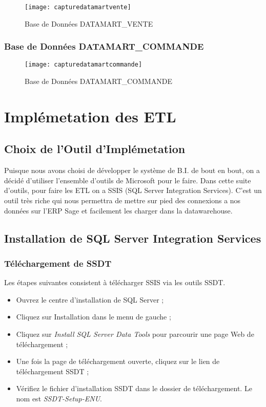 \begin{figure}[H]
    \centering
    \texttt{[image: capturedatamartvente]}
    \caption{Base de Données DATAMART\_VENTE}
    \label{fig:capturedatamartvente}
\end{figure}

\subsubsection{Base de Données DATAMART\_COMMANDE}

\begin{figure}[H]
    \centering
    \texttt{[image: capturedatamartcommande]}
    \caption{Base de Données DATAMART\_COMMANDE}
    \label{fig:capturedatamartcommande}
\end{figure}

\section{Implémetation des ETL}

\subsection{Choix de l'Outil d'Implémetation}
Puisque nous avons choisi de développer le système de B.I. de bout en bout, on a décidé d’utiliser l’ensemble d’outils de Microsoft pour le faire. Dans cette suite d’outils, pour faire les ETL on a SSIS (SQL Server Integration Services). C’est un outil très riche qui nous permettra de mettre sur pied des connexions a nos données sur l’ERP Sage et facilement les charger dans la datawarehouse. 

\subsection{Installation de SQL Server Integration Services}
\subsubsection{Téléchargement de SSDT}
Les étapes suivantes consistent à télécharger SSIS via les outils SSDT. 
\begin{itemize}
    \item Ouvrez le centre d'installation de SQL Server ;
    \item Cliquez sur Installation dans le menu de gauche ;
    \item Cliquez sur \textit{Install SQL Server Data Tools} pour parcourir une page Web de téléchargement ;
    \item Une fois la page de téléchargement ouverte, cliquez sur le lien de téléchargement SSDT ;
    \item  Vérifiez le fichier d'installation SSDT dans le dossier de téléchargement. Le nom est \textit{SSDT-Setup-ENU}.
\end{itemize} 

